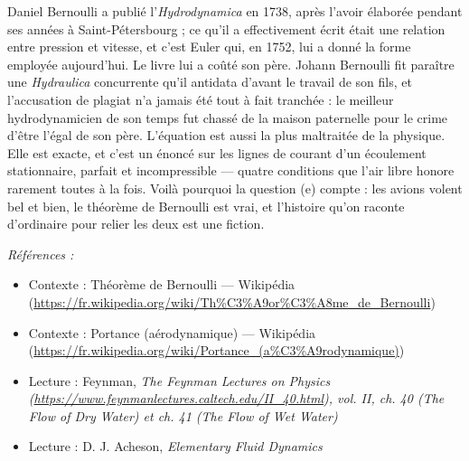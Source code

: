 \documentclass[11pt]{article}
\newenvironment{refs}{\par\small\noindent\emph{Références :}\begin{itemize}\setlength\itemsep{0pt}}{\end{itemize}\normalsize}
\begin{document}
\noindent Daniel Bernoulli a publié l'\textit{Hydrodynamica} en 1738, après l'avoir
élaborée pendant ses années à Saint-Pétersbourg ; ce qu'il a effectivement écrit était une
relation entre pression et vitesse, et c'est Euler qui, en 1752, lui a donné la forme employée
aujourd'hui. Le livre lui a coûté son père. Johann Bernoulli fit paraître une \textit{Hydraulica}
concurrente qu'il antidata d'avant le travail de son fils, et l'accusation de plagiat n'a jamais
été tout à fait tranchée : le meilleur hydrodynamicien de son temps fut chassé de la maison
paternelle pour le crime d'être l'égal de son père. L'équation est aussi la plus maltraitée de la
physique. Elle est exacte, et c'est un énoncé sur les lignes de courant d'un écoulement
stationnaire, parfait et incompressible --- quatre conditions que l'air libre honore rarement
toutes à la fois. Voilà pourquoi la question (e) compte : les avions volent bel et bien, le
théorème de Bernoulli est vrai, et l'histoire qu'on raconte d'ordinaire pour relier les deux est
une fiction.

\begin{refs}
\item Contexte : Théorème de Bernoulli --- Wikipédia (\url{https://fr.wikipedia.org/wiki/Th%C3%A9or%C3%A8me_de_Bernoulli})
\item Contexte : Portance (aérodynamique) --- Wikipédia (\url{https://fr.wikipedia.org/wiki/Portance_(a%C3%A9rodynamique)})
\item Lecture : Feynman, \textit{The Feynman Lectures on Physics (\url{https://www.feynmanlectures.caltech.edu/II_40.html}), vol. II, ch. 40 (The Flow of Dry Water) et ch. 41 (The Flow of Wet Water)}
\item Lecture : D. J. Acheson, \textit{Elementary Fluid Dynamics}
\end{refs}

\bigskip
\end{document}
